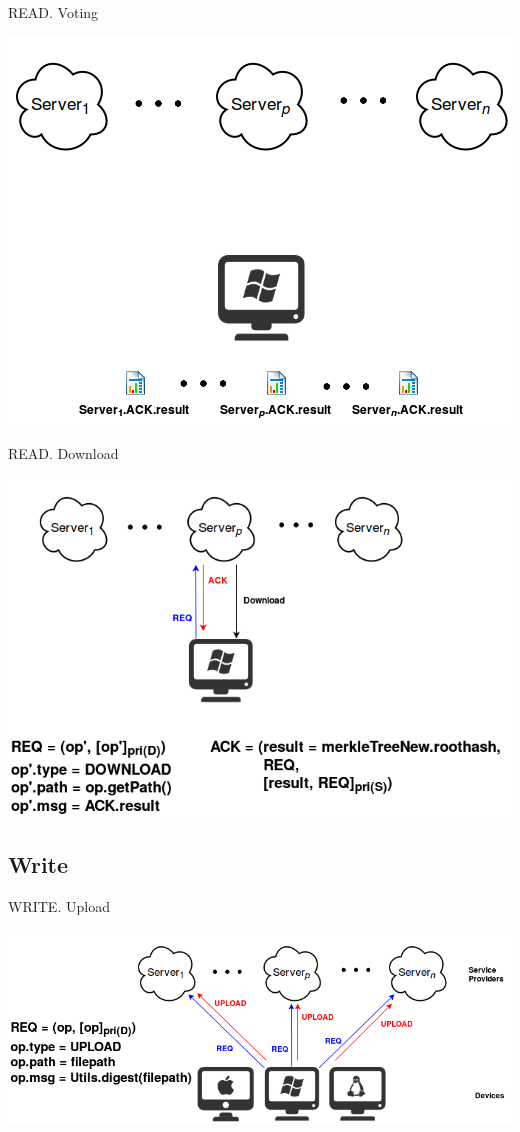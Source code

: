\documentclass{beamer}
\newcommand{\RNum}[1]{\uppercase\expandafter{\romannumeral #1\relax}}
\begin{document}
\begin{CJK}{UTF8}{bkai}
\begin{frame}{READ}{\RNum{2}. Voting}
	\begin{center}
	\includegraphics[width=.65\textwidth]{Read2.png}
	\end{center}
\end{frame}

\begin{frame}{READ}{\RNum{3}. Download}
	\begin{center}
	\includegraphics[width=.85\textwidth]{Read3.png}
	\end{center}
\end{frame}

\subsection{Write}
\begin{frame}{WRITE}{\RNum{1}. Upload}
	\begin{center}
	\includegraphics[width=.95\textwidth]{Write1.png}
	\end{center}
\end{frame}


\end{CJK}
\end{document}
